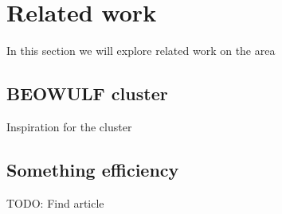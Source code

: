 \section{Related work}
In this section we will explore related work on the area
\subsection{BEOWULF cluster}
Inspiration for the cluster
\subsection{Something efficiency}
TODO: Find article